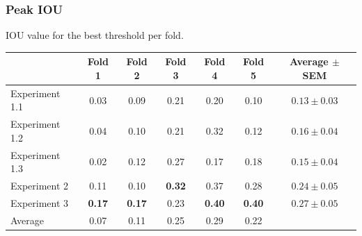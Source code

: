 \documentclass{beamer}
\begin{document}
    \begin{frame}
        \frametitle{Peak IOU}
        IOU value for the best threshold per fold.
        
        \footnotesize
        \begin{table}
	        \centering
	        \begin{tabular}{l*{6}{c}}
		        \hline
		         & \textbf{Fold 1} & \textbf{Fold 2} & \textbf{Fold 3} &\textbf{Fold 4} &\textbf{Fold 5} & \textbf{Average $\pm$ SEM} \\
		        \hline 
		        Experiment 1.1	&0.03	&0.09	&0.21	&0.20	&0.10	& $0.13 \pm 0.03$\\
		        Experiment 1.2	&0.04	&0.10	&0.21	&0.32	&0.12	& $0.16 \pm 0.04$\\
		        Experiment 1.3	&0.02	&0.12	&0.27	&0.17	&0.18	& $0.15 \pm 0.04$\\
		        Experiment 2	&0.11 	&0.10	&\textbf{0.32}	&0.37	& 0.28	& $0.24 \pm 0.05$\\
		        Experiment 3	&\textbf{0.17}	&\textbf{0.17}	&0.23	&\textbf{0.40}	&\textbf{0.40}	& $0.27 \pm 0.05$\\
		        Average			&0.07		&0.11	&0.25	&0.29	&0.22 &\\
		        \hline
	        \end{tabular}
        \end{table}
    \end{frame}
    
\end{document}
